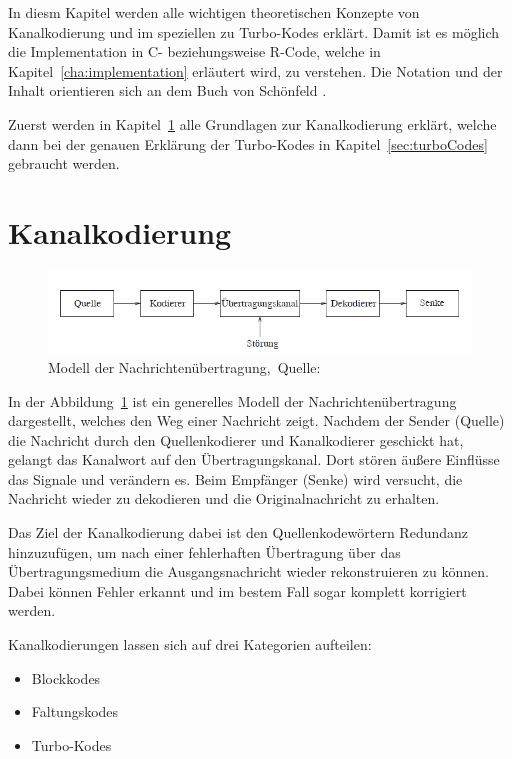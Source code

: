 In diesm Kapitel werden alle wichtigen theoretischen Konzepte von Kanalkodierung und im speziellen zu Turbo-Kodes erklärt. Damit ist es möglich die Implementation in C- beziehungsweise R-Code, welche in Kapitel~\ref{cha:implementation} erläutert wird, zu verstehen. Die Notation und der Inhalt orientieren sich an dem Buch von Schönfeld \cite{schoenfeld2012informations}.

Zuerst werden in Kapitel~\ref{sec:channelcoding} alle Grundlagen zur Kanalkodierung erklärt, welche dann bei der genauen Erklärung der Turbo-Kodes in Kapitel~\ref{sec:turboCodes} gebraucht werden.

\section{Kanalkodierung}
\label{sec:channelcoding}

\begin{figure}[th]
\centering
\includegraphics[width=\ScaleIfNeeded]{pictures/Channelmodel}
\caption{Modell der Nachrichtenübertragung,~Quelle:~\cite[10]{schoenfeld2012informations}}
\label{pic:channelmodel}
\end{figure}

In der Abbildung~\ref{pic:channelmodel} ist ein generelles Modell der Nachrichtenübertragung dargestellt, welches den Weg einer Nachricht zeigt. Nachdem der Sender (Quelle) die Nachricht durch den Quellenkodierer und Kanalkodierer geschickt hat, gelangt das Kanalwort auf den Übertragungskanal. Dort stören äußere Einflüsse das Signale und verändern es. Beim Empfänger (Senke) wird versucht, die Nachricht wieder zu dekodieren und die Originalnachricht zu erhalten.

Das Ziel der Kanalkodierung dabei ist den Quellenkodewörtern Redundanz hinzuzufügen, um nach einer fehlerhaften Übertragung über das Übertragungsmedium die Ausgangsnachricht wieder rekonstruieren zu können. Dabei können Fehler erkannt und im bestem Fall sogar komplett korrigiert werden.

Kanalkodierungen lassen sich auf drei Kategorien aufteilen:

\begin{itemize}
\item Blockkodes
\item Faltungskodes
\item Turbo-Kodes
\end{itemize} 

